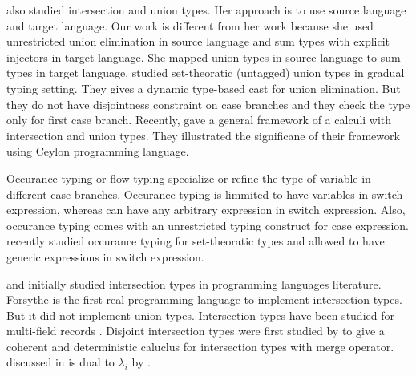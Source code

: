 \citet{dunfield2014elaborating} also studied intersection and union types. Her approach is to use source
language and target language. Our work is different from her work because she used unrestricted union
elimination in source language and sum types with explicit injectors in target language.
She mapped union types in source language to sum types in target language.
\citet{castagna2017gradual} studied set-theoratic (untagged) union types in gradual typing setting.
They gives a dynamic type-based cast for union elimination. But they do not have disjointness constraint
on case branches and they check the type only for first case branch.
Recently, \citet{muehlboeck2018empowering} gave a general framework of a calculi with intersection and 
union types. They illustrated the significane of their framework using Ceylon programming language. 

Occurance typing or flow typing \citet{tobin2008design} specialize or refine the type of variable in different
case branches. Occurance typing is limmited to have variables in switch expression, whereas \cal
can have any arbitrary expression in switch expression. Also, occurance typing comes with an
unrestricted typing construct for case expression. \citet{castagna2019revisiting} recently studied
occurance typing for set-theoratic types and allowed to have generic expressions in switch expression.

\citet{pottinger1980type} and \citet{coppo1981functional} initially studied intersection types in 
programming languages literature. Forsythe \cite{reynolds1988preliminary} is the first 
real programming language to implement intersection types. But it did not implement union types.
Intersection types have been studied for
multi-field records \cite{}.
Disjoint intersection types were first studied by \citet{oliveira2016disjoint} to give a coherent
and deterministic caluclus for intersection types with merge operator. \cal discussed in 
is dual to $\lambda_{i}$ by \citet{oliveira2016disjoint}.